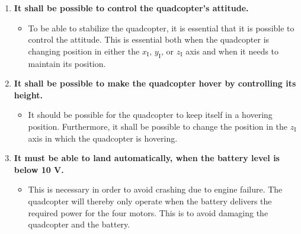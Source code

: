 \begin{enumerate}[label=\textbf{\arabic*})]
\item \textbf{It shall be possible to control the quadcopter's attitude.}
\begin{itemize}
\item[] To be able to stabilize the quadcopter, it is essential that it is possible to control the attitude. This is essential both when the quadcopter is changing position in either the $x_{\mathrm{I}}$, $y_{\mathrm{I}}$, or $z_{\mathrm{I}}$ axis and when it needs to maintain its position.
\end{itemize}


\item \textbf{It shall be possible to make the quadcopter hover by controlling its height.}
\begin{itemize}
\item[] It should be possible for the quadcopter to keep itself in a hovering position. Furthermore, it shall be possible to change the position in the $z_{\mathrm{I}}$ axis in which the quadcopter is hovering.
\end{itemize}



\item \textbf{It must be able to land automatically, when the battery level is below 10 V.}
\begin{itemize}
\item[] This is necessary in order to avoid crashing due to engine failure. The quadcopter will thereby only operate when the battery delivers the required power for the four motors. This is to avoid damaging the quadcopter and the battery.
\end{itemize}

\end{enumerate}

